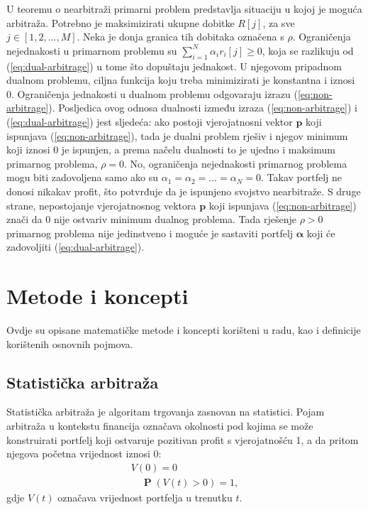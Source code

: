 \documentclass[lmodern, utf8, diplomski, numeric]{fer}
\newcommand{\matr}[1]{\mathbold{#1}}
\newcommand{\prob}[1]{\operatorname{\mathbf{P}}\q(#1\w)}
\newcommand{\q}{\left}
\newcommand{\w}{\right}
\begin{document}
  U teoremu o nearbitraži primarni problem predstavlja situaciju u kojoj je moguća arbitraža.
  Potrebno je maksimizirati ukupne dobitke $R\q[j\w]$, za sve $j \in \q[1, 2, \ldots, M\w]$.
  Neka je donja granica tih dobitaka označena s $\rho$.
  Ograničenja nejednakosti u primarnom problemu su $\sum_{i = 1}^{N} \alpha_i r_i\q[j\w] \ge 0$, koja se razlikuju od (\ref{eq:dual-arbitrage}) u tome što dopuštaju jednakost.
  U njegovom pripadnom dualnom problemu, ciljna funkcija koju treba minimizirati je konstantna i iznosi 0.
  Ograničenja jednakosti u dualnom problemu odgovaraju izrazu (\ref{eq:non-arbitrage}).
  Posljedica ovog odnosa dualnosti između izraza (\ref{eq:non-arbitrage}) i (\ref{eq:dual-arbitrage}) jest sljedeća: ako postoji vjerojatnosni vektor $\matr{p}$ koji ispunjava (\ref{eq:non-arbitrage}), tada je dualni problem rješiv i njegov minimum koji iznosi 0 je ispunjen, a prema načelu dualnosti to je ujedno i maksimum primarnog problema, $\rho = 0$.
  No, ograničenja nejednakosti primarnog problema mogu biti zadovoljena samo ako su $\alpha_1 = \alpha_2 = \ldots = \alpha_N = 0$.
  Takav portfelj ne donosi nikakav profit, što potvrđuje da je ispunjeno svojstvo nearbitraže.
  S druge strane, nepostojanje vjerojatnosnog vektora $\matr p$ koji ispunjava (\ref{eq:non-arbitrage}) znači da 0 nije ostvariv minimum dualnog problema.
  Tada rješenje $\rho > 0$ primarnog problema nije jedinstveno i moguće je sastaviti portfelj $\matr \alpha$ koji će zadovoljiti (\ref{eq:dual-arbitrage}).

  \chapter{Metode i koncepti}
  \label{ch:metode}
  Ovdje su opisane matematičke metode i koncepti korišteni u radu, kao i definicije korištenih osnovnih pojmova.
  
  \section{Statistička arbitraža}
  Statistička arbitraža  je algoritam trgovanja zasnovan na statistici.
  Pojam arbitraža u kontekstu financija označava okolnosti pod kojima se može konstruirati portfelj koji ostvaruje pozitivan profit s vjerojatnošću 1, a da pritom njegova početna vrijednost iznosi 0:
  \begin{equation}
  \begin{gathered}
  \label{eq:statarb}
  V\q(0\w) = 0\\
  \quad \prob{V\q(t\w) > 0} = 1,
  \end{gathered}
  \end{equation}
  gdje $V\q(t\w)$ označava vrijednost portfelja u trenutku $t$.
  
\end{document}
